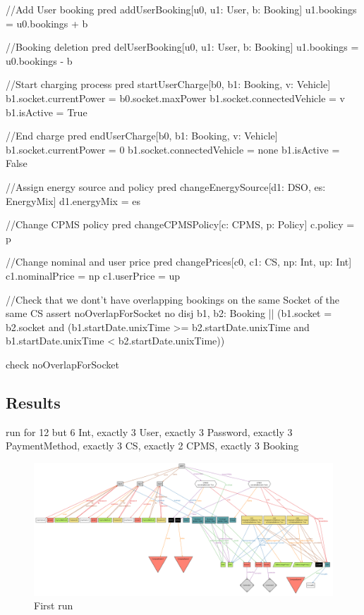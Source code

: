 \documentclass[11pt]{article}
\begin{document}
\begin{ffcode}
//Add User booking
pred addUserBooking[u0, u1: User, b: Booking] {
	u1.bookings = u0.bookings + b
}

//Booking deletion
pred delUserBooking[u0, u1: User, b: Booking] {
	u1.bookings = u0.bookings - b
}

//Start charging process
pred startUserCharge[b0, b1: Booking, v: Vehicle] {
	b1.socket.currentPower = b0.socket.maxPower
	b1.socket.connectedVehicle = v
	b1.isActive = True
}

//End charge
pred endUserCharge[b0, b1: Booking, v: Vehicle] {
	b1.socket.currentPower = 0
	b1.socket.connectedVehicle = none
	b1.isActive = False
}

//Assign energy source and policy
pred changeEnergySource[d1: DSO, es: EnergyMix] {
	d1.energyMix = es
}

//Change CPMS policy
pred changeCPMSPolicy[c: CPMS, p: Policy] {
	c.policy = p
}

//Change nominal and user price
pred changePrices[c0, c1: CS, np: Int, up: Int] {
	c1.nominalPrice = np
	c1.userPrice = up
}

//Check that we dont't have overlapping bookings on the same Socket of the same CS
assert noOverlapForSocket {
	no disj b1, b2: Booking |\textbar| (b1.socket = b2.socket and (b1.startDate.unixTime >= b2.startDate.unixTime and b1.startDate.unixTime < b2.startDate.unixTime))
}

check noOverlapForSocket

\end{ffcode}

\newpage

\subsection{Results}

\begin{ffcode}
run {} for 12 but 6 Int, exactly 3 User, exactly 3 Password, exactly 3 PaymentMethod, exactly 3 CS, exactly 2 CPMS, exactly 3 Booking
\end{ffcode}

\begin{figure}[!ht]
    \centering
    \includegraphics[width=190mm]{Alloy_2.png}
    \caption{First run}
    \label{fig:my_label}
\end{figure}
\end{document}
